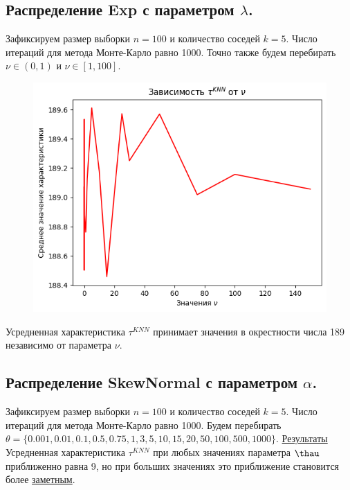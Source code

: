 \documentclass{report}
\begin{document}
\subsection{Распределение Exp с параметром $\lambda$.}
Зафиксируем размер выборки $n = 100$ и количество соседей $k = 5$. Число итераций для метода Монте-Карло равно 1000.
\newline
\newline
Точно также будем перебирать $\nu \in (0, 1)$ и $\nu \in [1, 100]$.
\newline
\newline
\begin{figure}[h]
    \centering
    \includegraphics[width=0.5\linewidth]{4.png}
\end{figure}
\newline
\newline
Усредненная характеристика $\tau^{KNN}$ принимает значения в окрестности числа 189 независимо от параметра $\nu$.

\subsection{Распределение SkewNormal с параметром $\alpha$.}
Зафиксируем размер выборки $n = 100$ и количество соседей $k = 5$. Число итераций для метода Монте-Карло равно 1000.
\newline
\newline
Будем перебирать $\theta = \{0.001, 0.01, 0.1, 0.5, 0.75, 1, 3, 5, 10, 15, 20, 50, 100, 500, 1000\}$.
\newline
\newline
\href{https://github.com/misshimichka/dm-random-graphs/blob/fbf3dd1bec269816312776019ca766ef0ce871b6/report/fix_construct_skewnorm_max_deg_knn.png}{Результаты}
\newline
\newline
Усредненная характеристика $\tau^{KNN}$ при любых значениях параметра $\thau$ приближенно равна 9, но при больших значениях это приближение становится более \href{https://github.com/misshimichka/dm-random-graphs/blob/dmitrii/report/report/fix_construct_skewnorm_alpha2avg_max_deg_knn.png}{заметным}. 
\end{document}
